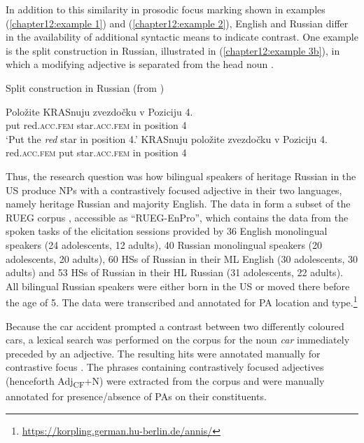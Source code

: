 \documentclass[output=paper,colorlinks,citecolor=brown]{langscibook}
\begin{document}
In addition to this similarity in prosodic focus marking shown in examples (\ref{chapter12:example 1}) and (\ref{chapter12:example 2}), English and Russian differ in the availability of additional syntactic means to indicate contrast. One example is the split construction in Russian, illustrated in (\ref{chapter12:example 3b}), in which a modifying adjective is separated from the head noun \citep[281]{Sekerina_Trueswell_2011}. 

\begin{exe}
    \ex Split construction in Russian (from \cite[282]{Sekerina_Trueswell_2011})
    \begin{xlist}
    \label{chapter12:example 3}
        \ex
        \gll Položite \textsc{KRAS}nuju       zvezdočku      v Poziciju 4. \\
         put         red.\textsc{acc.fem} star.\textsc{acc.fem} in position 4 \\
         \glt `Put the \emph{red} star in position 4.'
    \ex 
    \label{chapter12:example 3b}
    \gll \textsc{KRAS}nuju položite zvezdočku v Poziciju 4. \\
     red.\textsc{acc.fem} put star.\textsc{acc.fem} in position 4 \\
    \end{xlist}
\end{exe}

Thus, the research question was how bilingual speakers of heritage Russian in the US produce NPs with a contrastively focused adjective in their two languages, namely heritage Russian and majority English. The data in \citet{Zerbian_Böttcher_Zuban_2022} form a subset of the RUEG corpus \citep{RUEGcorpus2024}, accessible as “RUEG-EnPro”, which contains the data from the spoken tasks of the elicitation sessions provided by 36 English monolingual speakers (24 adolescents, 12 adults), 40 Russian monolingual speakers (20 adolescents, 20 adults), 60 HSs of Russian in their ML English (30 adolescents, 30 adults) and 53 HSs of Russian in their HL Russian (31 adolescents, 22 adults). All bilingual Russian speakers were either born in the US or moved there before the age of 5. The data were transcribed and annotated for PA location and type.\footnote{\url{https://korpling.german.hu-berlin.de/annis/}}

Because the car accident prompted a contrast between two differently coloured cars, a lexical search was performed on the corpus for the noun \textit{car} immediately preceded by an adjective. The resulting hits were annotated manually for contrastive focus \citep{Götze_Weskott_Endriss_Fiedler_Hinterwimmer_Petrova_Schwarz_Skopeteas_Stoel_2007}. The phrases containing contrastively focused adjectives (henceforth Adj\textsubscript{CF}+N) were extracted from the corpus and were manually annotated for presence/absence of PAs on their constituents.
\end{document}
